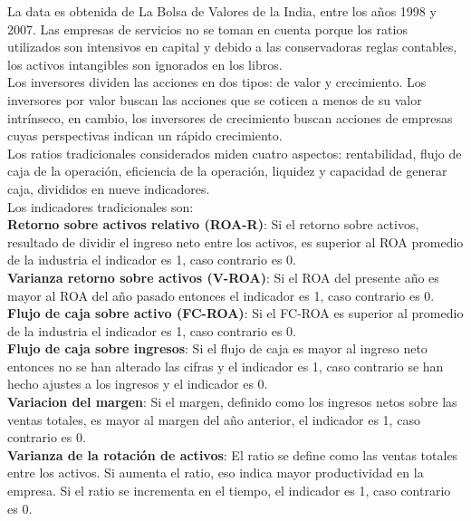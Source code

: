 La data es obtenida de La Bolsa de Valores de la India, entre los años 1998 y 2007. Las empresas de servicios no se toman en cuenta porque los ratios utilizados son intensivos en capital y debido a las conservadoras reglas contables, los activos intangibles son ignorados en los libros.\\

Los inversores dividen las acciones en dos tipos: de valor y crecimiento. Los inversores por valor buscan las acciones que se coticen a menos de su valor intrínseco, en cambio, los inversores de crecimiento buscan acciones de empresas cuyas perspectivas indican un rápido crecimiento.\\

Los ratios tradicionales considerados miden cuatro aspectos: rentabilidad, flujo de caja de la operación, eficiencia de la operación, liquidez y capacidad de generar caja, divididos en nueve indicadores.\\

Los indicadores tradicionales son:\\

\textbf{Retorno sobre activos relativo (ROA-R)}: Si el retorno sobre activos, resultado de dividir el ingreso neto entre los activos, es superior al ROA promedio de la industria el indicador es 1, caso contrario es 0.\\

\textbf{Varianza retorno sobre activos (V-ROA)}: Si el ROA del presente año es mayor al ROA del año pasado entonces el indicador es 1, caso contrario es 0.\\

\textbf{Flujo de caja sobre activo (FC-ROA)}: Si el FC-ROA es superior al promedio de la industria el indicador es 1, caso contrario es 0.\\

\textbf{Flujo de caja sobre ingresos}: Si el flujo de caja es mayor al ingreso neto entonces no se han alterado las cifras y el indicador es 1, caso contrario se han hecho ajustes a los ingresos y el indicador es 0.\\

\textbf{Variacion del margen}: Si el margen, definido como los ingresos netos sobre las ventas totales, es mayor al margen del año anterior, el indicador es 1, caso contrario es 0.\\

\textbf{Varianza de la rotación de activos}: El ratio se define como las ventas totales entre los activos. Si aumenta el ratio, eso indica mayor productividad en la empresa. Si el ratio se incrementa en el tiempo, el indicador es 1, caso contrario es 0.\\

